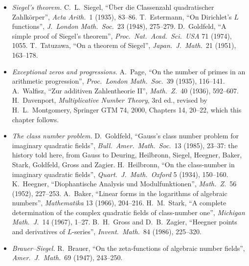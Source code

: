 \begin{itemize}
\item \emph{Siegel's theorem.} C.~L.~Siegel, ``\"Uber die Classenzahl quadratischer Zahlk\"orper'', \emph{Acta Arith.}\ 1 (1935), 83--86. T.~Estermann, ``On Dirichlet's $L$ functions'', \emph{J.\ London Math.\ Soc.}\ 23 (1948), 275--279. D.~Goldfeld, ``A simple proof of Siegel's theorem'', \emph{Proc.\ Nat.\ Acad.\ Sci.\ USA} 71 (1974), 1055. T.~Tatuzawa, ``On a theorem of Siegel'', \emph{Japan.\ J.\ Math.}\ 21 (1951), 163--178.
\item \emph{Exceptional zeros and progressions.} A.~Page, ``On the number of primes in an arithmetic progression'', \emph{Proc.\ London Math.\ Soc.}\ 39 (1935), 116--141. A.~Walfisz, ``Zur additiven Zahlentheorie II'', \emph{Math.\ Z.}\ 40 (1936), 592--607. H.~Davenport, \emph{Multiplicative Number Theory}, 3rd ed., revised by H.~L.~Montgomery, Springer GTM 74, 2000, Chapters 14, 20--22, which this chapter follows.
\item \emph{The class number problem.} D.~Goldfeld, ``Gauss's class number problem for imaginary quadratic fields'', \emph{Bull.\ Amer.\ Math.\ Soc.}\ 13 (1985), 23--37: the history told here, from Gauss to Deuring, Heilbronn, Siegel, Heegner, Baker, Stark, Goldfeld, Gross and Zagier. H.~Heilbronn, ``On the class-number in imaginary quadratic fields'', \emph{Quart.\ J.\ Math.\ Oxford} 5 (1934), 150--160.
K.~Heegner, ``Diophantische Analysis und Modulfunktionen'', \emph{Math.\ Z.}\ 56 (1952), 227--253. A.~Baker, ``Linear forms in the logarithms of algebraic numbers'', \emph{Mathematika} 13 (1966), 204--216. H.~M.~Stark, ``A complete determination of the complex quadratic fields of class-number one'', \emph{Michigan Math.\ J.}\ 14 (1967), 1--27. B.~H.~Gross and D.~B.~Zagier, ``Heegner points and derivatives of $L$-series'',
\emph{Invent.\ Math.}\ 84 (1986), 225--320.
\item \emph{Brauer--Siegel.} R.~Brauer, ``On the zeta-functions of algebraic number fields'', \emph{Amer.\ J.\ Math.}\ 69 (1947), 243--250.
\end{itemize}
